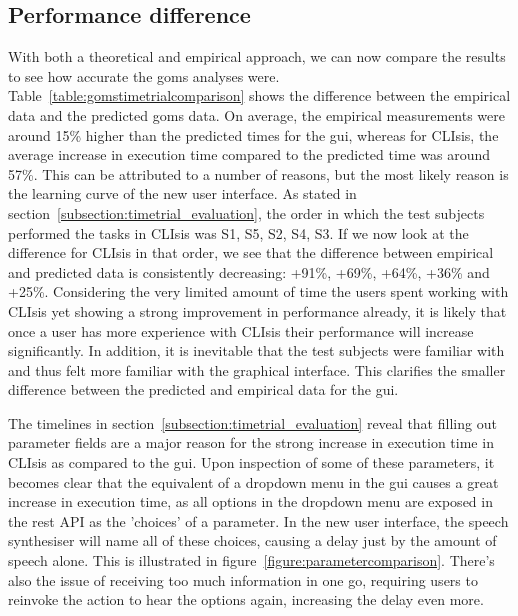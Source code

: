 \subsection{Performance difference}
\label{subsection:performancedifference}
With both a theoretical and empirical approach, we can now compare the results to see how accurate the \acrshort{goms} analyses were. Table~\ref{table:gomstimetrialcomparison} shows the difference between the empirical data and the predicted \acrshort{goms} data. On average, the empirical measurements were around 15\% higher than the predicted times for the \acrshort{gui}, whereas for CLIsis, the average increase in execution time compared to the predicted time was around 57\%. This can be attributed to a number of reasons, but the most likely reason is the learning curve of the new user interface. As stated in section~\ref{subsection:timetrial_evaluation}, the order in which the test subjects performed the tasks in CLIsis was S1, S5, S2, S4, S3. If we now look at the difference for CLIsis in that order, we see that the difference between empirical and predicted data is consistently decreasing: +91\%, +69\%, +64\%, +36\% and +25\%. Considering the very limited amount of time the users spent working with CLIsis yet showing a strong improvement in performance already, it is likely that once a user has more experience with CLIsis their performance will increase significantly. In addition, it is inevitable that the test subjects were familiar with  and thus felt more familiar with the graphical interface. This clarifies the smaller difference between the predicted and empirical data for the \acrshort{gui}.

The timelines in section~\ref{subsection:timetrial_evaluation} reveal that filling out parameter fields are a major reason for the strong increase in execution time in CLIsis as compared to the \acrshort{gui}. Upon inspection of some of these parameters, it becomes clear that the equivalent of a dropdown menu in the \acrshort{gui} causes a great increase in execution time, as all options in the dropdown menu are exposed in the \acrshort{rest} API as the 'choices' of a parameter. In the new user interface, the speech synthesiser will name all of these choices, causing a delay just by the amount of speech alone. This is illustrated in figure~\ref{figure:parametercomparison}. There's also the issue of receiving too much information in one go, requiring users to reinvoke the action to hear the options again, increasing the delay even more.

